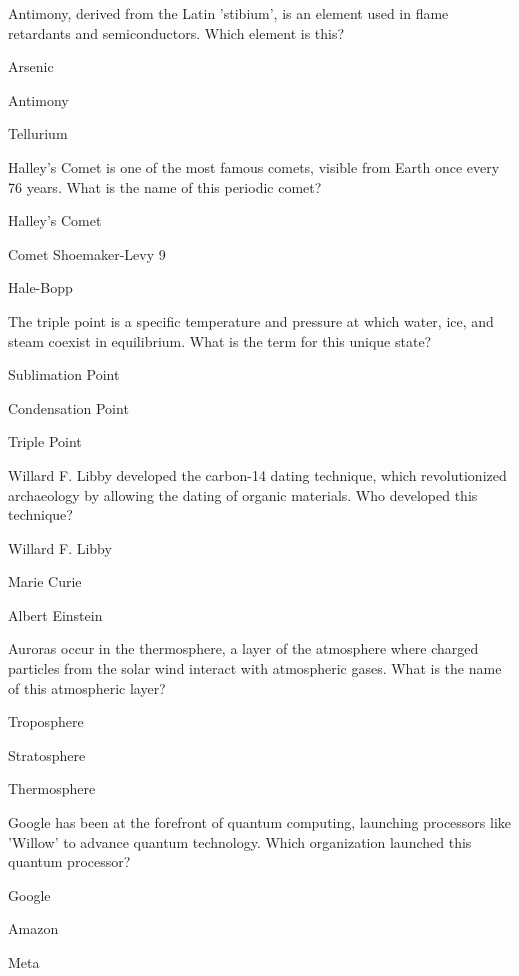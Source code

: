 \begin{enhancedmcq}{Antimony, derived from the Latin 'stibium', is an element used in flame retardants and semiconductors. Which element is this?}
\item Arsenic
\item Antimony
\item Tellurium

\end{enhancedmcq}
\begin{enhancedmcq}{Halley's Comet is one of the most famous comets, visible from Earth once every 76 years. What is the name of this periodic comet?}
\item Halley's Comet
\item Comet Shoemaker-Levy 9
\item Hale-Bopp

\end{enhancedmcq}
\begin{enhancedmcq}{The triple point is a specific temperature and pressure at which water, ice, and steam coexist in equilibrium. What is the term for this unique state?}
\item Sublimation Point
\item Condensation Point
\item Triple Point

\end{enhancedmcq}
\begin{enhancedmcq}{Willard F. Libby developed the carbon-14 dating technique, which revolutionized archaeology by allowing the dating of organic materials. Who developed this technique?}
\item Willard F. Libby
\item Marie Curie
\item Albert Einstein

\end{enhancedmcq}
\begin{enhancedmcq}{Auroras occur in the thermosphere, a layer of the atmosphere where charged particles from the solar wind interact with atmospheric gases. What is the name of this atmospheric layer?}
\item Troposphere
\item Stratosphere
\item Thermosphere

\end{enhancedmcq}
\begin{enhancedmcq}{Google has been at the forefront of quantum computing, launching processors like 'Willow' to advance quantum technology. Which organization launched this quantum processor?}
\item Google
\item Amazon
\item Meta

\end{enhancedmcq}
